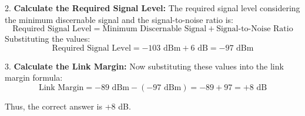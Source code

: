2. \textbf{Calculate the Required Signal Level:}
   The required signal level considering the minimum discernable signal and the signal-to-noise ratio is:
   \[
   \text{Required Signal Level} = \text{Minimum Discernable Signal} + \text{Signal-to-Noise Ratio}
   \]
   Substituting the values:
   \[
   \text{Required Signal Level} = -103 \text{ dBm} + 6 \text{ dB} = -97 \text{ dBm}
   \]

3. \textbf{Calculate the Link Margin:}
   Now substituting these values into the link margin formula:
   \[
   \text{Link Margin} = -89 \text{ dBm} - (-97 \text{ dBm}) = -89 + 97 = +8 \text{ dB}
   \]

Thus, the correct answer is +8 dB.

